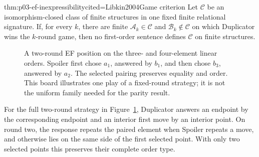 \begin{hbcorollary}{thm:p03-ef-inexpressibility}{cited=Libkin2004}{Game criterion}
Let \(\mathcal C\) be an isomorphism-closed class of finite structures in one
fixed finite relational signature.  If, for every \(k\), there are finite
\(\mathcal A_k\in\mathcal C\) and \(\mathcal B_k\notin\mathcal C\) on which
Duplicator wins the \(k\)-round game, then no first-order sentence defines
\(\mathcal C\) on finite structures.
\end{hbcorollary}

\begin{figure}[htbp]
\centering
{}
\caption{A two-round EF position on the three- and four-element linear orders.
Spoiler first chose \(a_1\), answered by \(b_1\), and
then chose \(b_3\), answered by \(a_2\).  The selected pairing preserves
equality and order.  This board illustrates one play of a fixed-round strategy;
it is not the uniform family needed for the parity result.}
\label{fig:p03-ef-board}
\end{figure}

For the full two-round strategy in Figure~\ref{fig:p03-ef-board}, Duplicator
answers an endpoint by the corresponding endpoint and an interior first move
by an interior point.  On round two, the response repeats the paired element
when Spoiler repeats a move, and otherwise lies on the same side of the first
selected point.  With only two selected points this preserves their complete
order type.

